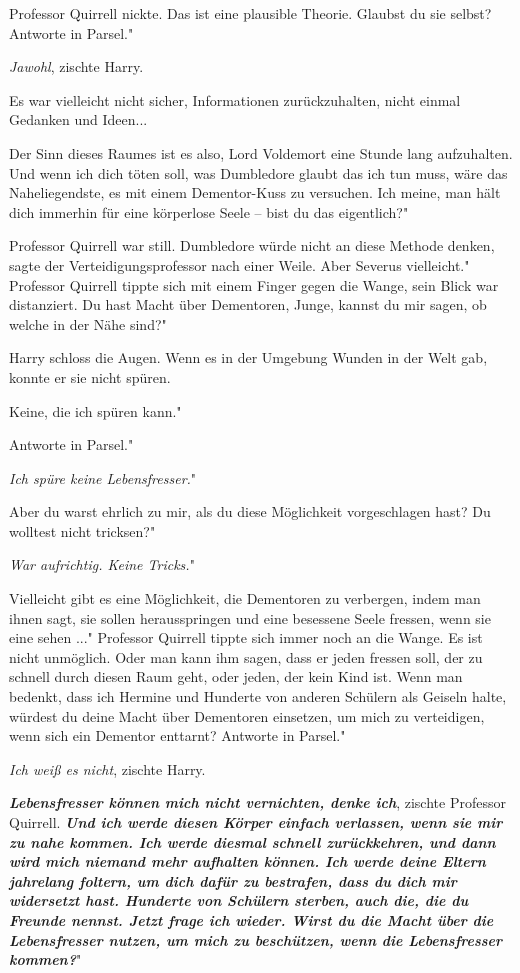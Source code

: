 Professor Quirrell nickte. \glqq Das ist eine plausible Theorie. Glaubst du sie
selbst? Antworte in Parsel."

\glqq \emph{Jawohl}\grqq{}, zischte Harry.

Es war vielleicht nicht sicher, Informationen zurückzuhalten, nicht einmal
Gedanken und Ideen...

\glqq Der Sinn dieses Raumes ist es also, Lord Voldemort eine Stunde lang
aufzuhalten. Und wenn ich dich töten soll, was Dumbledore glaubt das ich tun
muss, wäre das Naheliegendste, es mit einem Dementor-Kuss zu versuchen. Ich
meine, man hält dich immerhin für eine körperlose Seele – bist du das
eigentlich?"

Professor Quirrell war still. \glqq Dumbledore würde nicht an diese Methode
denken\grqq{}, sagte der Verteidigungsprofessor nach einer Weile. \glqq Aber
Severus vielleicht." Professor Quirrell tippte sich mit einem Finger gegen die
Wange, sein Blick war distanziert. \glqq Du hast Macht über Dementoren, Junge,
kannst du mir sagen, ob welche in der Nähe sind?"

Harry schloss die Augen. Wenn es in der Umgebung Wunden in der Welt gab, konnte
er sie nicht spüren.

\glqq Keine, die ich spüren kann."

\glqq Antworte in Parsel."

\glqq \emph{Ich spüre keine Lebensfresser.}"

\glqq Aber du warst ehrlich zu mir, als du diese Möglichkeit vorgeschlagen hast?
Du wolltest nicht tricksen?"

\glqq \emph{War aufrichtig. Keine Tricks.}"

\glqq Vielleicht gibt es eine Möglichkeit, die Dementoren zu verbergen, indem
man ihnen sagt, sie sollen herausspringen und eine besessene Seele fressen, wenn
sie eine sehen ..." Professor Quirrell tippte sich immer noch an die Wange.
\glqq Es ist nicht unmöglich. Oder man kann ihm sagen, dass er jeden fressen
soll, der zu schnell durch diesen Raum geht, oder jeden, der kein Kind ist. Wenn
man bedenkt, dass ich Hermine und Hunderte von anderen Schülern als Geiseln
halte, würdest du deine Macht über Dementoren einsetzen, um mich zu verteidigen,
wenn sich ein Dementor enttarnt? Antworte in Parsel."

\glqq \emph{Ich weiß es nicht}\grqq{}, zischte Harry.

\glqq \textbf{\emph{Lebensfresser können mich nicht vernichten, denke
ich}}\grqq{}, zischte Professor Quirrell. \glqq \textbf{\emph{Und ich werde
diesen Körper einfach verlassen, wenn sie mir zu nahe kommen. Ich werde diesmal
schnell zurückkehren, und dann wird mich niemand mehr aufhalten können. Ich
werde deine Eltern jahrelang foltern, um dich dafür zu bestrafen, dass du dich
mir widersetzt hast. Hunderte von Schülern sterben, auch die, die du Freunde
nennst. Jetzt frage ich wieder. Wirst du die Macht über die Lebensfresser
nutzen, um mich zu beschützen, wenn die Lebensfresser kommen?}}"

